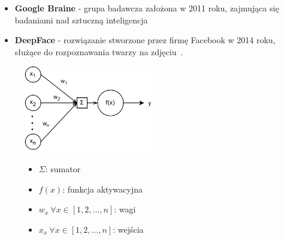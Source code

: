 \begin{itemize}
    \item \textbf{Google Braine} - grupa badawcza założona w 2011 roku, zajmująca się badaniami nad sztuczną inteligencja
    \item \textbf{DeepFace} - rozwiązanie stworzone przez firmę Facebook w 2014 roku, służące do rozpoznawania twarzy na zdjęciu~\cite{Koch2022, Fradkov2020}.
\end{itemize}

\begin{figure}[H]
    \centering
    \includegraphics[width=0.5\textwidth]{images/neuron}
    \begin{itemize}
        \item[] $\Sigma$: sumator
        \item[] $f(x)$: funkcja aktywacyjna
        \item[] $w_x \  \forall x \in [1, 2, ..., n]$: wagi
        \item[] $x_x \  \forall x \in [1, 2, ..., n]$: wejścia
    \end{itemize}
    \label{fig:neuron}
\end{figure}

